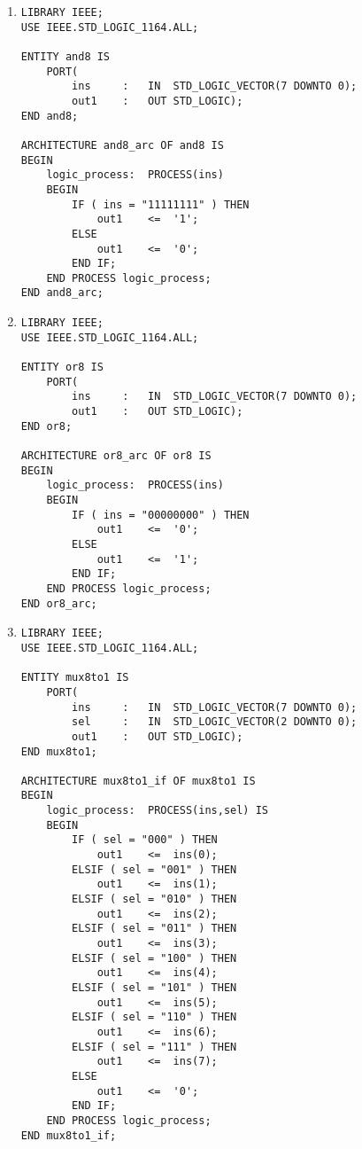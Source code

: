 \begin{enumerate}
\begin{lstlisting}
ENTITY Exercise_5_3 IS
	PORT(
		A,B		:	IN	STD_LOGIC_VECTOR(1 DOWNTO 0);
		D		:	IN	STD_LOGIC;
		E_out	:	OUT	STD_LOGIC);
END Exercise_5_3;

ARCHITECTURE Exercise_5_3_arc OF Exercise_5_3 IS
	SIGNAL Aout,Bout,Cout,Dout	:	STD_LOGIC;
BEGIN
	Aout	<=	A(1) AND A(2);
	Bout	<=	B(1) OR B(2);
	Cout	<=	B(2) AND Dout;
	Dout	<=	NOT D;
	E_out	<=	Aout OR Bout OR Cout;
END Exercise_5_3_arc;
	\end{lstlisting}

	\item
	\begin{lstlisting}
LIBRARY IEEE;
USE IEEE.STD_LOGIC_1164.ALL;

ENTITY and8 IS
	PORT(
		ins		:	IN	STD_LOGIC_VECTOR(7 DOWNTO 0);
		out1	:	OUT	STD_LOGIC);
END and8;

ARCHITECTURE and8_arc OF and8 IS
BEGIN
	logic_process:	PROCESS(ins)
	BEGIN
		IF ( ins = "11111111" ) THEN
			out1	<=	'1';
		ELSE
			out1	<=	'0';
		END IF;
	END PROCESS logic_process;
END and8_arc;
	\end{lstlisting}

	\item
	\begin{lstlisting}
LIBRARY IEEE;
USE IEEE.STD_LOGIC_1164.ALL;

ENTITY or8 IS
	PORT(
		ins		:	IN	STD_LOGIC_VECTOR(7 DOWNTO 0);
		out1	:	OUT	STD_LOGIC);
END or8;

ARCHITECTURE or8_arc OF or8 IS
BEGIN
	logic_process:	PROCESS(ins)
	BEGIN
		IF ( ins = "00000000" ) THEN
			out1	<=	'0';
		ELSE
			out1	<=	'1';
		END IF;
	END PROCESS logic_process;
END or8_arc;
	\end{lstlisting}

	\item
	\begin{lstlisting}
LIBRARY IEEE;
USE IEEE.STD_LOGIC_1164.ALL;

ENTITY mux8to1 IS
	PORT(
		ins		:	IN	STD_LOGIC_VECTOR(7 DOWNTO 0);
		sel		:	IN	STD_LOGIC_VECTOR(2 DOWNTO 0);
		out1	:	OUT	STD_LOGIC);
END mux8to1;

ARCHITECTURE mux8to1_if OF mux8to1 IS
BEGIN
	logic_process:	PROCESS(ins,sel) IS
	BEGIN
		IF ( sel = "000" ) THEN
			out1	<=	ins(0);
		ELSIF ( sel = "001" ) THEN
			out1	<=	ins(1);
		ELSIF ( sel = "010" ) THEN
			out1	<=	ins(2);
		ELSIF ( sel = "011" ) THEN
			out1	<=	ins(3);
		ELSIF ( sel = "100" ) THEN
			out1	<=	ins(4);
		ELSIF ( sel = "101" ) THEN
			out1	<=	ins(5);
		ELSIF ( sel = "110" ) THEN
			out1	<=	ins(6);
		ELSIF ( sel = "111" ) THEN
			out1	<=	ins(7);
		ELSE
			out1	<=	'0';
		END IF;
	END PROCESS logic_process;
END mux8to1_if;


\end{lstlisting}
\end{enumerate}
